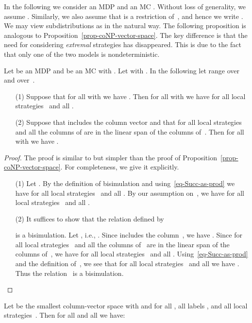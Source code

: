 In the following we consider an MDP  and an MC .
Without loss of generality, we assume .
Similarly, we also assume that  is a restriction of~, and hence we write .
We may view subdistributions  as  in the natural way.
The following proposition is analogous to Proposition~\ref{prop-coNP-vector-space}.
The key difference is that the need for considering \emph{extremal} strategies has disappeared.
This is due to the fact that only one of the two models is nondeterministic.

\begin{prop}\label{prop-coNP-vector-space-MC}
Let  be an MDP
and  be an MC with .
Let  with .
In the following let  range over~ and  over~.
\begin{enumerate}
\item[(1)] Suppose that for all  with  we have .
    Then for all  with  we have  for all local strategies~ and all .
\item[(2)] Suppose that  includes the column vector  and that for all local strategies~ and all  the columns of  are in the linear span of the columns of~.
    Then for all  with  we have .
\end{enumerate}
\end{prop}

\begin{proof}
The proof is similar to but simpler than the proof of Proposition~\ref{prop-coNP-vector-space}.
For completeness, we give it explicitly.
\begin{itemize}[align=left]
\item[(1)]
Let .
By the definition of bisimulation and using~\eqref{eq-Succ-as-prod} we have  for all local strategies~ and all .
By our assumption on~, we have  for all local strategies~ and all .
\item[(2)]
It suffices to show that the relation  defined by

is a bisimulation.
Let , i.e., .
Since  includes the column~, we have .
Since for all local strategies~ and all  the columns of~ are in the linear span of the columns of~, we have  for all local strategies~ and all .
Using~\eqref{eq-Succ-as-prod} and the definition of~, we see that
for all local strategies~ and all  we have .
Thus the relation~ is a bisimulation. \qedhere
\end{itemize}
\end{proof}

\begin{cor}\label{cor-coNP-vector-space-MC}
Let  be the smallest column-vector space with  and  for all , all labels , and all local strategies~.
Then for all  and all  we have:

\end{cor}

